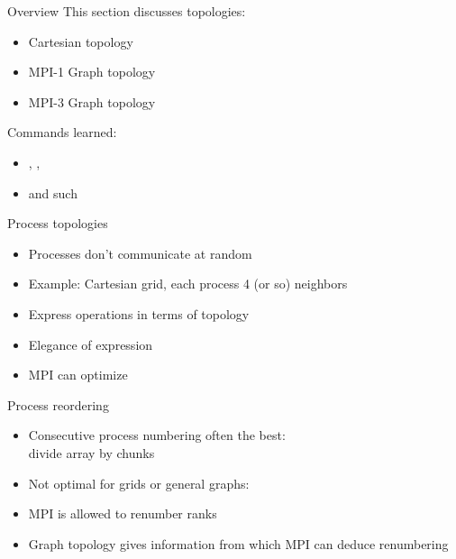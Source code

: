 
\begin{numberedframe}{Overview}
  This section discusses topologies:
  \begin{itemize}
  \item Cartesian topology
  \item MPI-1 Graph topology
  \item MPI-3 Graph topology
  \end{itemize}

  Commands learned:
  \begin{itemize}
  \item {}, ,
  \item {} and such
  \end{itemize}
\end{numberedframe}

\begin{numberedframe}{Process topologies}
  \begin{itemize}
  \item Processes don't communicate at random
  \item Example: Cartesian grid, each process 4 (or so) neighbors
  \item Express operations in terms of topology
  \item Elegance of expression
  \item MPI can optimize
  \end{itemize}
\end{numberedframe}

\begin{numberedframe}{Process reordering}
  \begin{itemize}
  \item Consecutive process numbering often the best:\\
    divide array by chunks
  \item Not optimal for grids or general graphs:
  \item MPI is allowed to renumber ranks
  \item Graph topology gives information from which MPI can deduce
    renumbering
  \end{itemize}
\end{numberedframe}

